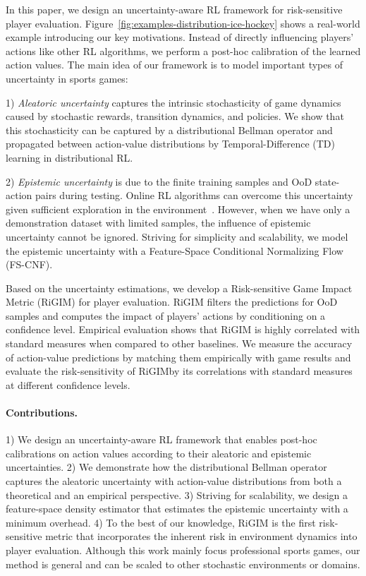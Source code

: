 \documentclass[letterpaper]{article} %
\newcommand{\sys}{RiGIM}
\newcommand{\system}{\sys\;}
\begin{document}
In this paper, we design an uncertainty-aware RL framework for risk-sensitive player evaluation. Figure~\ref{fig:examples-distribution-ice-hockey} shows a real-world example introducing our key motivations. Instead of directly influencing players' actions like other RL algorithms, we perform a post-hoc calibration of the learned action values. The main idea of our framework is to model important types of uncertainty in sports games: 

1) {\it Aleatoric uncertainty} captures the intrinsic stochasticity of game dynamics caused by stochastic rewards, transition dynamics, and policies. We show that this stochasticity can be captured by a distributional Bellman operator and propagated between action-value distributions by Temporal-Difference (TD) learning in distributional RL.
  
2) {\it Epistemic uncertainty} is due to the finite training samples and OoD state-action pairs during testing. Online RL algorithms can overcome this uncertainty given sufficient exploration in the environment~\cite{Mavrin2019DistributionalRL}. However, when we have only a demonstration dataset with limited samples, the influence of epistemic uncertainty cannot be ignored. Striving for simplicity and scalability, we model the epistemic uncertainty with a Feature-Space Conditional Normalizing Flow (FS-CNF).

Based on the uncertainty estimations, we develop a Risk-sensitive Game Impact Metric (RiGIM) for player evaluation. RiGIM filters the predictions for OoD samples and computes the impact of players' actions by conditioning on a confidence level.
Empirical evaluation shows that RiGIM is highly correlated with standard measures when compared to other baselines. 
We measure the accuracy of action-value predictions by matching them empirically with game results and evaluate the risk-sensitivity of \system by its correlations with standard measures at different confidence levels.

\paragraph{Contributions.} 1) We design an uncertainty-aware RL framework that enables post-hoc calibrations on action values according to their aleatoric and epistemic uncertainties. 2) We demonstrate how the distributional Bellman operator captures the aleatoric uncertainty with action-value distributions from both a theoretical and an empirical perspective. 3) Striving for scalability, we design a feature-space density estimator that estimates the epistemic uncertainty with a minimum overhead. 4) To the best of our knowledge, RiGIM is the first risk-sensitive metric that incorporates the inherent risk in environment dynamics into player evaluation. Although this work mainly focus professional sports games, our method is general and can be scaled to other stochastic environments or domains.
\end{document}
